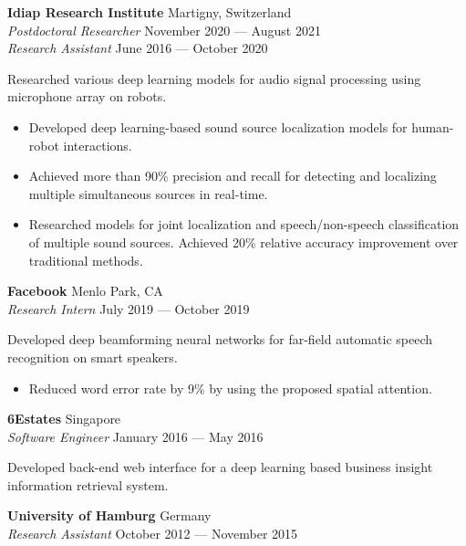 \documentclass[a4paper,9pt]{extarticle} %
\begin{document}
\textbf{Idiap Research Institute}  \hfill Martigny, Switzerland \\
\textit{Postdoctoral Researcher} \hfill November 2020 --- August 2021 \\
\textit{Research Assistant} \hfill June 2016 --- October 2020%
\vspace{-.5\parskip}

Researched various deep learning models for audio signal processing using microphone array on robots.
\vspace{-.9\parskip}
\begin{itemize}[nosep]
  \item Developed deep learning-based sound source localization models for human-robot interactions. 
  \item Achieved more than 90\% precision and recall for detecting and localizing multiple simultaneous sources in real-time.
  \item Researched models for joint localization and speech/non-speech classification of multiple sound sources. Achieved 20\% relative accuracy improvement over traditional methods.
\end{itemize}


\textbf{Facebook}  \hfill Menlo Park, CA\\
\textit{Research Intern} \hfill July 2019 --- October 2019%
\vspace{-.5\parskip}

Developed deep beamforming neural networks for far-field automatic speech recognition on smart speakers.
\vspace{-.9\parskip}
\begin{itemize}[nosep]
  \item Reduced word error rate by 9\% by using the proposed spatial attention.
\end{itemize}


\textbf{6Estates}  \hfill Singapore \\
\textit{Software Engineer} \hfill January 2016 --- May 2016%
\vspace{-.5\parskip}

Developed back-end web interface for a deep learning based business insight information retrieval system.


\textbf{University of Hamburg} \hfill Germany \\
\textit{Research Assistant}  \hfill October 2012 --- November 2015%
\vspace{-.5\parskip}
\end{document}
